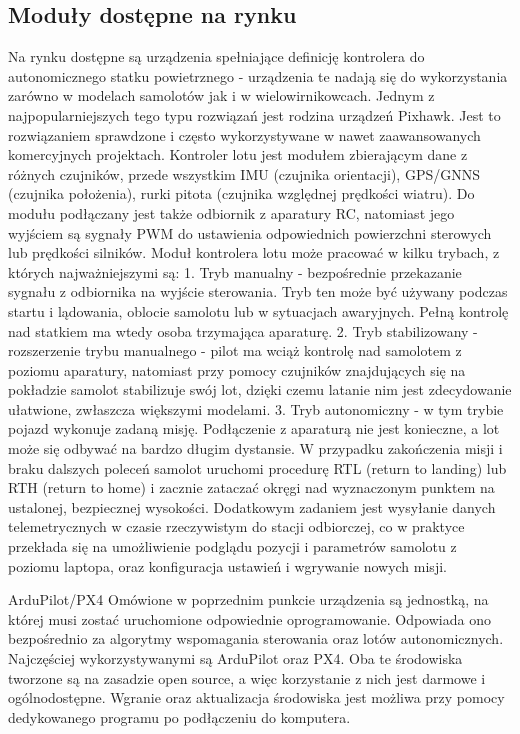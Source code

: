 \documentclass[12pt, a4paper]{article}
\begin{document}
\subsection{Moduły dostępne na rynku}
Na rynku dostępne są urządzenia spełniające definicję kontrolera do autonomicznego statku powietrznego - urządzenia te nadają się do wykorzystania zarówno w modelach samolotów jak i w wielowirnikowcach. Jednym z najpopularniejszych tego typu rozwiązań jest rodzina urządzeń Pixhawk. Jest to rozwiązaniem sprawdzone i często wykorzystywane w nawet zaawansowanych komercyjnych projektach. Kontroler lotu jest modułem zbierającym dane z różnych czujników, przede wszystkim IMU (czujnika orientacji), GPS/GNNS (czujnika położenia), rurki pitota (czujnika względnej prędkości wiatru). Do modułu podłączany jest także odbiornik z aparatury RC, natomiast jego wyjściem są sygnały PWM do ustawienia odpowiednich powierzchni sterowych lub prędkości silników. 
Moduł kontrolera lotu może pracować w kilku trybach, z których najważniejszymi są:
1.	Tryb manualny - bezpośrednie przekazanie sygnału z odbiornika na wyjście sterowania. Tryb ten może być używany podczas startu i lądowania, oblocie samolotu lub w sytuacjach awaryjnych. Pełną kontrolę nad statkiem ma wtedy osoba trzymająca aparaturę.
2.	Tryb stabilizowany - rozszerzenie trybu manualnego - pilot ma wciąż kontrolę nad samolotem z poziomu aparatury, natomiast przy pomocy czujników znajdujących się na pokładzie samolot stabilizuje swój lot, dzięki czemu latanie nim jest zdecydowanie ułatwione, zwłaszcza większymi modelami.
3.	Tryb autonomiczny - w tym trybie pojazd wykonuje zadaną misję. Podłączenie z aparaturą nie jest konieczne, a lot może się odbywać na bardzo długim dystansie. W przypadku zakończenia misji i braku dalszych poleceń samolot uruchomi procedurę RTL (return to landing) lub RTH (return to home) i zacznie zataczać okręgi nad wyznaczonym punktem na ustalonej, bezpiecznej wysokości.
Dodatkowym zadaniem jest wysyłanie danych telemetrycznych w czasie rzeczywistym do stacji odbiorczej, co w praktyce przekłada się na umożliwienie podglądu pozycji i parametrów samolotu z poziomu laptopa, oraz konfiguracja ustawień i wgrywanie nowych misji.

ArduPilot/PX4
Omówione w poprzednim punkcie urządzenia są jednostką, na której musi zostać uruchomione odpowiednie oprogramowanie. Odpowiada ono bezpośrednio za algorytmy wspomagania sterowania oraz lotów autonomicznych. Najczęściej wykorzystywanymi są ArduPilot oraz PX4. Oba te środowiska tworzone są na zasadzie open source, a więc korzystanie z nich jest darmowe i ogólnodostępne. Wgranie oraz aktualizacja środowiska jest możliwa przy pomocy dedykowanego programu po podłączeniu do komputera.
\end{document}
